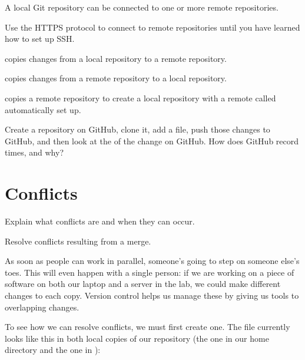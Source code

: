 \begin{keypoints}
\begin{swcitemize}
\item
  A local Git repository can be connected to one or more remote
  repositories.
\item
  Use the HTTPS protocol to connect to remote repositories until you
  have learned how to set up SSH.
\item
   copies changes from a local repository to a remote
  repository.
\item
   copies changes from a remote repository to a local
  repository.
\item
   copies a remote repository to create a local
  repository with a remote called  automatically set up.
\end{swcitemize}
\end{keypoints}

\begin{challenge}
  Create a repository on GitHub, clone it, add a file, push those
  changes to GitHub, and then look at the
   of the change on GitHub. How does
  GitHub record times, and why?
\end{challenge}

\section{Conflicts}

\begin{objectives}
\begin{swcitemize}
\item
  Explain what conflicts are and when they can occur.
\item
  Resolve conflicts resulting from a merge.
\end{swcitemize}
\end{objectives}

As soon as people can work in parallel, someone's going to step on
someone else's toes. This will even happen with a single person: if we
are working on a piece of software on both our laptop and a server in
the lab, we could make different changes to each copy. Version control
helps us manage these  by giving us
tools to  overlapping changes.

To see how we can resolve conflicts, we must first create one. The file
 currently looks like this in both local copies of our
 repository (the one in our home directory and the one
in ):

